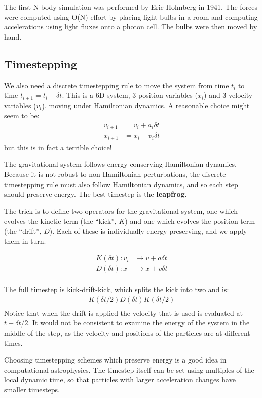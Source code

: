 \documentclass[12pt]{article}
\begin{document}
The first N-body simulation was performed by Eric Holmberg in 1941. The forces were computed using O(N) effort by placing light bulbs in a room and computing accelerations using light fluxes onto a photon cell. The bulbs were then moved by hand.

\subsection{Timestepping}

We also need a discrete timestepping rule to move the system from time $t_i$ to time $t_{i+1} = t_i + \delta t$. This is a 6D system, 3 position variables ($x_i$) and 3 velocity variables ($v_i$), moving under Hamiltonian dynamics. A reasonable choice might seem to be:
\begin{align}
v_{i+1} &= v_i + a_i \delta t \\
x_{i+1} &= x_i + v_i \delta t
\end{align}
but this is in fact a terrible choice!

The gravitational system follows energy-conserving Hamiltonian dynamics. Because it is not robust to non-Hamiltonian perturbations, the discrete timestepping rule must also follow Hamiltonian dynamics, and so each step should preserve energy. The best timestep is the \textbf{leapfrog}.

The trick is to define two operators for the gravitational system, one which evolves the kinetic term (the ``kick'', $K$) and one which evolves the position term (the ``drift'', $D$). Each of these is individually energy preserving, and we apply them in turn.

\begin{align}
 K(\delta t): v_i &\to v + a \delta t \\
 D(\delta t): x &\to x + v \delta t \\
\end{align}

The full timestep is kick-drift-kick, which splits the kick into two and is:
\begin{align}
 K(\delta t/2) D(\delta t) K(\delta t/2) \\
\end{align}
Notice that when the drift is applied the velocity that is used is evaluated at $t + \delta t /2$. It would not be consistent to examine the energy of the system in the middle of the step, as the velocity and positions of the particles are at different times.

Choosing timestepping schemes which preserve energy is a good idea in computational astrophysics. The timestep itself can be set using multiples of the local dynamic time, so that particles with larger acceleration changes have smaller timesteps.
\end{document}
